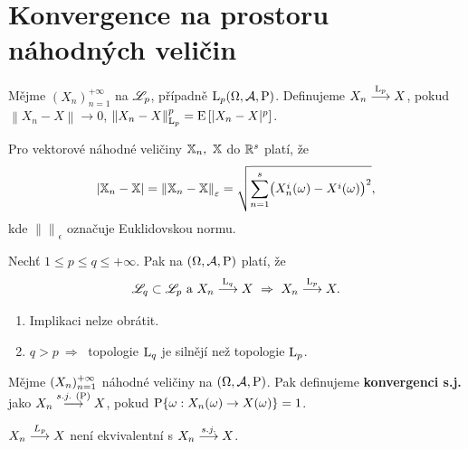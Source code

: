 
\chapter{Konvergence na prostoru náhodných veličin}
\begin{define}
	Mějme $(X_n)_{n=1}^{+\infty}$ na $\mathscr{L}_p$, případně $\mathrm{L}_p(\Omega,\mathcal{A},\mathrm{P})$. Definujeme $X_n\stackrel{\mathrm{L}_p}{\longrightarrow} X$, pokud\newline $\left\| X_n-X\right\| \to 0$,  $\left\| X_n-X\right\|_{\mathrm{L}_p}^p=\mathrm{E} \left[ |X_n-X|^p \right]$.
\end{define}
\begin{remark}
	Pro vektorové náhodné veličiny $\mathbb{X}_n,~\mathbb{X}$ do $\mathbb{R}^s$ platí, že
	$$|\mathbb{X}_n-\mathbb{X}|=\left\|\mathbb{X}_n-\mathbb{X}\right\|_\varepsilon = \sqrt{\sum\limits_{n=1}^s \bigl( X_n^i(\omega)-X^i(\omega)\bigr)^2},$$ kde $\left\| \right\|_\epsilon$ označuje Euklidovskou normu.
\end{remark}
\begin{theorem}
	Nechť $1\leq p\leq q\leq +\infty$. Pak na $(\Omega,\mathcal{A},\mathrm{P})$ platí, že $$\mathscr{L}_q\subset \mathscr{L}_p\text{ a }X_n\stackrel{\mathrm{L}_q}{\longrightarrow}X~\Rightarrow~ X_n\stackrel{\mathrm{L}_p}{\longrightarrow}X.$$ 
\end{theorem}
\begin{remark}
	\begin{enumerate}
		\item Implikaci nelze obrátit. 
		\item $q>p~\Rightarrow~$ topologie $\mathrm{L}_q$ je silnějí než topologie $\mathrm{L}_p$.
	\end{enumerate}
\end{remark}
\begin{define}
	Mějme $(X_n)_{n=1}^{+\infty}$ náhodné veličiny na $(\Omega,\mathcal{A},\mathrm{P})$. Pak definujeme \textbf{konvergenci s.j.} jako $X_n\stackrel{s.j.~(\mathrm{P})}{\longrightarrow}X$, pokud $\mathrm{P}\{ \omega:X_n(\omega)\to X(\omega) \}=1$.
\end{define}
\begin{remark}
	$X_n\stackrel{L_p}{\longrightarrow} X $ není ekvivalentní s $ X_n\stackrel{s.j.}{\longrightarrow} X$.
\end{remark}
